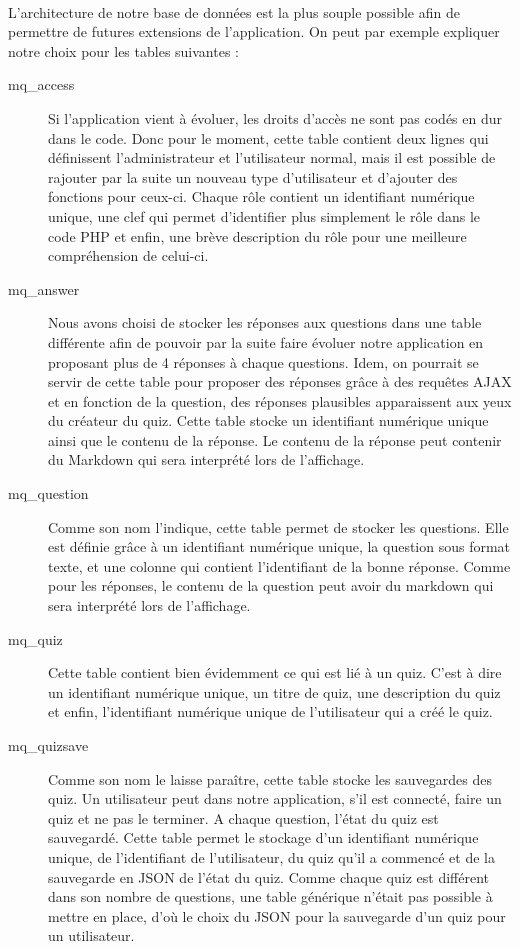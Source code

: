 \documentclass[12pt]{article}
\begin{document}
        \paragraph{}
        L'architecture de notre base de données est la plus souple possible afin de permettre de futures extensions de l'application. On peut par exemple expliquer notre choix pour les tables suivantes :
        \begin{description}
            \item[mq\_access] Si l'application vient à évoluer, les droits d'accès ne sont pas codés en dur dans le code. Donc pour le moment, cette table contient deux lignes qui définissent l'administrateur et l'utilisateur normal, mais il est possible de rajouter par la suite un nouveau type d'utilisateur et d'ajouter des fonctions pour ceux-ci. Chaque rôle contient un identifiant numérique unique, une clef qui permet d'identifier plus simplement le rôle dans le code PHP et enfin, une brève description du rôle pour une meilleure compréhension de celui-ci.
            \item[mq\_answer] Nous avons choisi de stocker les réponses aux questions dans une table différente afin de pouvoir par la suite faire évoluer notre application en proposant plus de 4 réponses à chaque questions. Idem, on pourrait se servir de cette table pour proposer des réponses grâce à des requêtes AJAX et en fonction de la question, des réponses plausibles apparaissent aux yeux du créateur du quiz. Cette table stocke un identifiant numérique unique ainsi que le contenu de la réponse. Le contenu de la réponse peut contenir du Markdown qui sera interprété lors de l'affichage.
            \item[mq\_question] Comme son nom l'indique, cette table permet de stocker les questions. Elle est définie grâce à un identifiant numérique unique, la question sous format texte, et une colonne qui contient l'identifiant de la bonne réponse. Comme pour les réponses, le contenu de la question peut avoir du markdown qui sera interprété lors de l'affichage.
            \item[mq\_quiz] Cette table contient bien évidemment ce qui est lié à un quiz. C'est à dire un identifiant numérique unique, un titre de quiz, une description du quiz et enfin, l'identifiant numérique unique de l'utilisateur qui a créé le quiz.
            \item[mq\_quizsave] Comme son nom le laisse paraître, cette table stocke les sauvegardes des quiz. Un utilisateur peut dans notre application, s'il est connecté, faire un quiz et ne pas le terminer. A chaque question, l'état du quiz est sauvegardé. Cette table permet le stockage d'un identifiant numérique unique, de l'identifiant de l'utilisateur, du quiz qu'il a commencé et de la sauvegarde en JSON de l'état du quiz. Comme chaque quiz est différent dans son nombre de questions, une table générique n'était pas possible à mettre en place, d'où le choix du JSON pour la sauvegarde d'un quiz pour un utilisateur.

\end{description}
\end{document}
